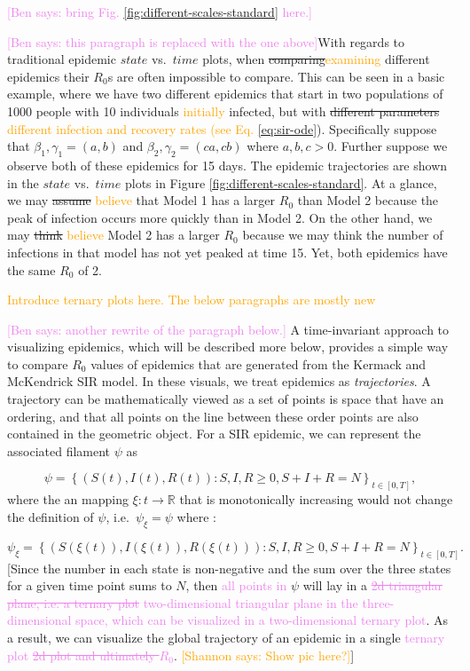 \documentclass[
  shortnames]{jss}
\begin{document}
\textcolor{violet}{[Ben says: bring Fig. \ref{fig:different-scales-standard} here.]}

\textcolor{violet}{[Ben says: this paragraph is replaced with the one above]}With
regards to traditional epidemic \(state\) vs.~\(time\) plots, when
\sout{comparing}\textcolor{orange}{examining} different epidemics their
\(R_0\)s are often impossible to compare. This can be seen in a basic
example, where we have two different epidemics that start in two
populations of 1000 people with 10 individuals
\textcolor{orange}{initially} infected, but with
\sout{different parameters}
\textcolor{orange}{different infection and recovery rates (see Eq. \ref{eq:sir-ode}}).
Specifically suppose that \(\beta_1, \gamma_1 = (a,b)\) and
\(\beta_2, \gamma_2 = (ca,cb)\) where \(a, b, c > 0\). Further suppose
we observe both of these epidemics for 15 days. The epidemic
trajectories are shown in the \(state\) vs.~\(time\) plots in Figure
\ref{fig:different-scales-standard}. At a glance, we may \sout{assume}
\textcolor{orange}{believe} that Model 1 has a larger \(R_0\) than Model
2 because the peak of infection occurs more quickly than in Model 2. On
the other hand, we may \sout{think} \textcolor{orange}{believe} Model 2
has a larger \(R_0\) because we may think the number of infections in
that model has not yet peaked at time 15. Yet, both epidemics have the
same \(R_0\) of 2.

\textcolor{orange}{Introduce ternary plots here.  The below paragraphs are mostly new}

\textcolor{violet}{[Ben says: another rewrite of the paragraph below.]}
A time-invariant approach to visualizing epidemics, which will be
described more below, provides a simple way to compare \(R_0\) values of
epidemics that are generated from the Kermack and McKendrick SIR model.
In these visuals, we treat epidemics as \textit{trajectories}. A
trajectory can be mathematically viewed as a set of points is space that
have an ordering, and that all points on the line between these order
points are also contained in the geometric object. For a SIR epidemic,
we can represent the associated filament \(\psi\) as

\[
\psi = \left \{(S(t), I(t), R(t)): S, I, R \ge 0, S + I + R = N \right \}_{t\in[0,T]},
\] where the an mapping \(\xi : t \to \mathbb{R}\) that is monotonically
increasing would not change the definition of \(\psi\),
i.e.~\(\psi_\xi = \psi\) where :

\[
\psi_\xi = \left \{(S(\xi(t)), I(\xi(t)), R(\xi(t))): S, I, R \ge 0, S + I + R = N \right \}_{t\in[0,T]}.
\] {[}Since the number in each state is non-negative and the sum over
the three states for a given time point sums to \(N\), then
\textcolor{violet}{all points in} \(\psi\) will lay in a
\textcolor{violet}{\sout{2d triangular plane, i.e. a ternary plot}}
\textcolor{violet}{two-dimensional triangular plane in the three-dimensional space, which can be visualized in a two-dimensional ternary plot}.
As a result, we can visualize the global trajectory of an epidemic in a
single
\textcolor{violet}{ternary plot \sout{2d plot and ultimately $R_0$}}.
\textcolor{orange}{[Shannon says: Show pic here?]}{]}
\end{document}
